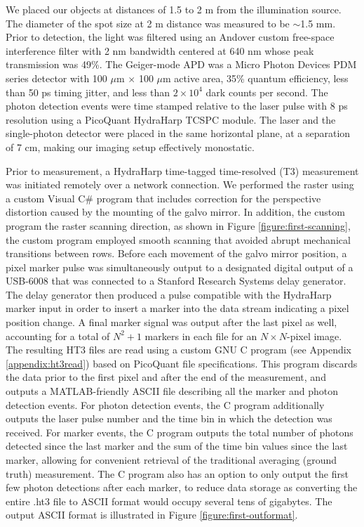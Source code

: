 We placed our objects at distances of 1.5 to 2 m from the illumination source. The diameter of the spot size at 2 m distance was measured to be $\sim$1.5 mm. Prior to detection, the light was filtered using an Andover custom free-space interference filter with 2 nm bandwidth centered at 640 nm whose peak transmission was 49\%. The Geiger-mode APD was a Micro Photon Devices PDM series detector with 100 $\mu$m $\times$ 100 $\mu$m active area, 35\% quantum efficiency, less than 50 ps timing jitter, and less than $2\times 10^4$ dark counts per second. The photon detection events were time stamped relative to the laser pulse with 8 ps resolution using a PicoQuant HydraHarp TCSPC module. The laser and the single-photon detector were placed in the same horizontal plane, at a separation of 7 cm, making our imaging setup effectively monostatic.

Prior to measurement, a HydraHarp time-tagged time-resolved (T3) measurement was initiated remotely over a network connection. We performed the raster using a custom Visual C\# program that includes correction for the perspective distortion caused by the mounting of the galvo mirror. In addition, the custom program the raster scanning direction, as shown in Figure \ref{figure:first-scanning}, the custom program employed smooth scanning that avoided abrupt mechanical transitions between rows. Before each movement of the galvo mirror position, a pixel marker pulse was simultaneously output to a designated digital output of a USB-6008 that was connected to a Stanford Research Systems delay generator. The delay generator then produced a pulse compatible with the HydraHarp marker input in order to insert a marker into the data stream indicating a pixel position change. A final marker signal was output after the last pixel as well, accounting for a total of $N^2+1$ markers in each file for an $N \times N$-pixel image. The resulting HT3 files are read using a custom GNU C program (see Appendix \ref{appendix:ht3read}) based on PicoQuant file specifications. This program discards the data prior to the first pixel and after the end of the measurement, and outputs a MATLAB-friendly ASCII file describing all the marker and photon detection events. For photon detection events, the C program additionally outputs the laser pulse number and the time bin in which the detection was received. For marker events, the C program outputs the total number of photons detected since the last marker and the sum of the time bin values since the last marker, allowing for convenient retrieval of the traditional averaging (ground truth) measurement. The C program also has an option to only output the first few photon detections after each marker, to reduce data storage as converting the entire .ht3 file to ASCII format would occupy several tens of gigabytes. The output ASCII format is illustrated in Figure \ref{figure:first-outformat}.

